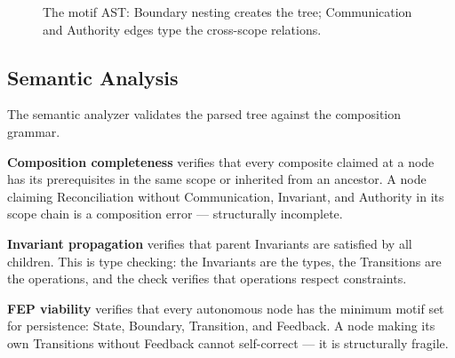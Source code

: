 \documentclass[11pt,a4paper]{article}
\begin{document}
\begin{figure}[ht]
\centering
{}
\caption{The motif AST: Boundary nesting creates the tree; Communication and Authority edges type the cross-scope relations.}
\end{figure}

\subsection{Semantic Analysis}

The semantic analyzer validates the parsed tree against the composition grammar.

\textbf{Composition completeness} verifies that every composite claimed at a node has its prerequisites in the same scope or inherited from an ancestor. A node claiming Reconciliation without Communication, Invariant, and Authority in its scope chain is a composition error --- structurally incomplete.

\textbf{Invariant propagation} verifies that parent Invariants are satisfied by all children. This is type checking: the Invariants are the types, the Transitions are the operations, and the check verifies that operations respect constraints.

\textbf{FEP viability} verifies that every autonomous node has the minimum motif set for persistence: State, Boundary, Transition, and Feedback. A node making its own Transitions without Feedback cannot self-correct --- it is structurally fragile.
\end{document}
